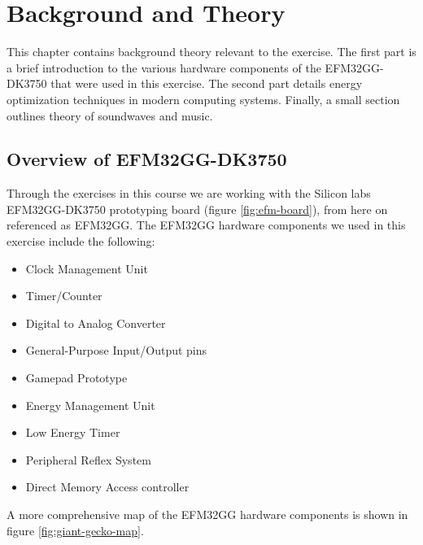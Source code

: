 \chapter{Background and Theory}

This chapter contains background theory relevant to the exercise. The first part is a brief introduction to the various hardware components of the EFM32GG-DK3750 that were used in this exercise. The second part details energy optimization techniques in modern computing systems. Finally, a small section outlines theory of soundwaves and music.


\section{Overview of EFM32GG-DK3750}
Through the exercises in this course we are working with the Silicon labs EFM32GG-DK3750 prototyping board (figure \ref{fig:efm-board}), from here on referenced as EFM32GG. The EFM32GG hardware components we used in this exercise include the following:
\begin{itemize}
	\item Clock Management Unit
	\item Timer/Counter
	\item Digital to Analog Converter
	\item General-Purpose Input/Output pins
	\item Gamepad Prototype
	\item Energy Management Unit
  \item Low Energy Timer
  \item Peripheral Reflex System
	\item Direct Memory Access controller
\end{itemize}
A more comprehensive map of the EFM32GG hardware components is shown in figure \ref{fig:giant-gecko-map}.

